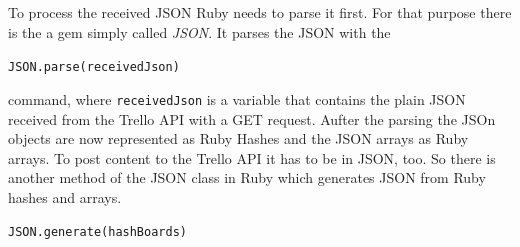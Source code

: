 To process the received JSON Ruby needs to parse it first. For that purpose there is the a gem simply called \emph{JSON}. It parses the JSON with the 

\begin{center}
\lstinline{JSON.parse(receivedJson)} 
\end{center}
command, where \lstinline{receivedJson} is a variable that contains the plain JSON received from the Trello API with a GET request. Aufter the parsing the JSOn objects are now represented as Ruby Hashes and the JSON arrays as Ruby arrays. To post content to the Trello API it has to be in JSON, too. So there is another method of the JSON class in Ruby which generates JSON from Ruby hashes and arrays. 

\begin{center}
\lstinline{JSON.generate(hashBoards)} 
\end{center}